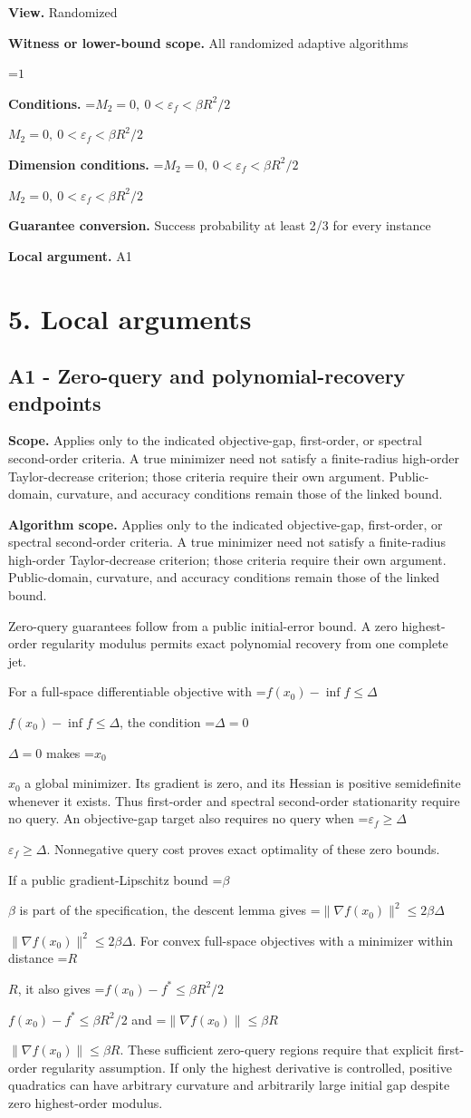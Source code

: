 \documentclass[10pt,a4paper]{article}
\newcommand{\AtlasMath}[1]{\par\begingroup\centering\setbox0=\hbox{$\displaystyle #1$}\ifdim\wd0>1.4\linewidth\typeout{ATLAS WIDE FORMULA: \the\wd0}\fi\ifdim\wd0>\linewidth\resizebox{\linewidth}{!}{\box0}\else\box0\fi\par\endgroup}
\newcommand{\AtlasInlineMath}[1]{\begingroup\setbox0=\hbox{$#1$}\ifdim\wd0>.4\linewidth\endgroup\AtlasMath{#1}\else\endgroup$#1$\fi}
\begin{document}
\textbf{View.} Randomized

\textbf{Witness or lower-bound scope.} All randomized adaptive algorithms

\AtlasMath{1}
\textbf{Conditions.} \AtlasInlineMath{M_2=0,\ 0<\varepsilon_f<\beta R^2/2}

\textbf{Dimension conditions.} \AtlasInlineMath{M_2=0,\ 0<\varepsilon_f<\beta R^2/2}

\textbf{Guarantee conversion.} Success probability at least 2/3 for every instance

\textbf{Local argument.} A1

\section{5. Local arguments}
\subsection{A1 - Zero-query and polynomial-recovery endpoints}
\textbf{Scope.} Applies only to the indicated objective-gap, first-order, or spectral second-order criteria. A true minimizer need not satisfy a finite-radius high-order Taylor-decrease criterion; those criteria require their own argument. Public-domain, curvature, and accuracy conditions remain those of the linked bound.

\textbf{Algorithm scope.} Applies only to the indicated objective-gap, first-order, or spectral second-order criteria. A true minimizer need not satisfy a finite-radius high-order Taylor-decrease criterion; those criteria require their own argument. Public-domain, curvature, and accuracy conditions remain those of the linked bound.

Zero-query guarantees follow from a public initial-error bound. A zero highest-order regularity modulus permits exact polynomial recovery from one complete jet.

For a full-space differentiable objective with \AtlasInlineMath{f(x_0)-\inf f\le\Delta}, the condition \AtlasInlineMath{\Delta=0} makes \AtlasInlineMath{x_0} a global minimizer. Its gradient is zero, and its Hessian is positive semidefinite whenever it exists. Thus first-order and spectral second-order stationarity require no query. An objective-gap target also requires no query when \AtlasInlineMath{\varepsilon_f\ge\Delta}. Nonnegative query cost proves exact optimality of these zero bounds.

If a public gradient-Lipschitz bound \AtlasInlineMath{\beta} is part of the specification, the descent lemma gives \AtlasInlineMath{\|\nabla f(x_0)\|^2\le2\beta\Delta}. For convex full-space objectives with a minimizer within distance \AtlasInlineMath{R}, it also gives \AtlasInlineMath{f(x_0)-f^*\le\beta R^2/2} and \AtlasInlineMath{\|\nabla f(x_0)\|\le\beta R}. These sufficient zero-query regions require that explicit first-order regularity assumption. If only the highest derivative is controlled, positive quadratics can have arbitrary curvature and arbitrarily large initial gap despite zero highest-order modulus.
\end{document}
